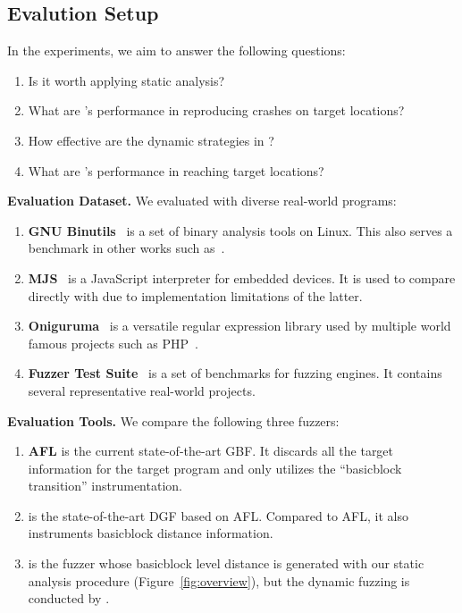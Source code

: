 \subsection{Evalution Setup}\label{subsec:evalsetup}

In the experiments, we aim to answer the following questions:
\begin{enumerate}[\textbf{RQ}1]
    \item  Is it worth applying static analysis?
    \item  What are {\dFOT}'s performance in reproducing crashes on target locations?
    \item  How effective are the dynamic strategies in {\dFOT}?
    \item  What are {\dFOT}'s performance in reaching target locations?  
\end{enumerate}

\textbf{Evaluation Dataset.}
We evaluated \dFOT with diverse real-world programs:
\begin{enumerate}[(1)] 
    \item \textbf{GNU Binutils}~\cite{binutils} is a set of binary analysis tools on Linux. 
This also serves a benchmark in other works such as~\cite{Bohme:2016:CGF, Bohme:2017:DGF, FairFuzz}.
    \item \textbf{MJS}~\cite{mjs} is a JavaScript interpreter for embedded devices.
    It is used to compare \dFOT directly with {\aflgo} due to implementation limitations of the latter.
    \item \textbf{Oniguruma}~\cite{oniguruma} is a versatile regular expression library used by multiple world famous projects such as PHP~\cite{php}.
    \item \textbf{Fuzzer Test Suite}~\cite{fuzzer-test-suite} is a set of benchmarks for fuzzing engines.
    It contains several representative real-world projects.
\end{enumerate}

\textbf{Evaluation Tools.} We compare the following three fuzzers:
\begin{enumerate}[(1)] 
\item \textbf{AFL} is the current state-of-the-art GBF. It discards all the target information for the target program and only utilizes the ``basicblock transition'' instrumentation.
\item \textbf{{\aflgo}} is the state-of-the-art DGF based on AFL.
Compared to AFL, it also instruments basicblock distance information.
\item \textbf{{\dGO}} is the fuzzer whose basicblock level distance is generated with our static analysis procedure (Figure~\ref{fig:overview}), but the dynamic fuzzing is conducted by {\aflgo}.
\end{enumerate}


